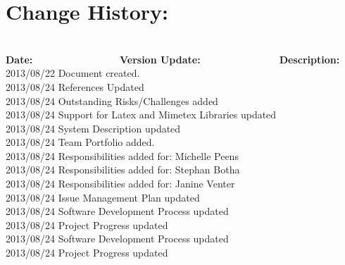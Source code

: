 \documentclass[29pt,a4paper]{moderncv}
\begin{document}
\section{\textbf{Change History:}}
\begin{tabbing}
\\\textbf{Date:} ~~~~~~~~~~~~~~~~~\= \textbf{Version Update:}~~~~~~~~~~~~~~~~\= \textbf{Description:}\\
2013/08/22 \> Document created.\\
2013/08/24  \> References Updated\\
2013/08/24  \> Outstanding Risks/Challenges added\\
2013/08/24  \> Support for Latex and Mimetex Libraries updated\\
2013/08/24  \> System Description updated\\
2013/08/24  \> Team Portfolio added. \\
2013/08/24  \> Responsibilities added for: Michelle Peens\\
2013/08/24  \> Responsibilities added for: Stephan Botha\\	
2013/08/24  \> Responsibilities added for: Janine Venter\\
2013/08/24  \> Issue Management Plan updated\\
2013/08/24  \> Software Development Process updated\\
2013/08/24  \> Project Progress updated\\
2013/08/24  \> Software Development Process updated\\
2013/08/24  \> Project Progress updated\\
\end{tabbing}

\newpage
\end{document}
